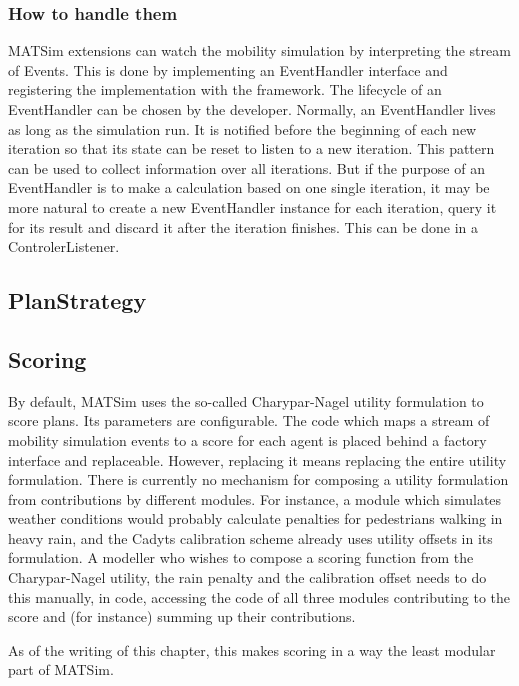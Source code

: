 \subsubsection{How to handle them}
MATSim extensions can watch the mobility simulation by interpreting the stream of Events. This is done
by implementing an EventHandler interface and registering the implementation with the framework. The lifecycle of
an EventHandler can be chosen by the developer. Normally, an EventHandler lives as long as the simulation run.
It is notified before the beginning of each new iteration so that its state can be reset to listen to a new
iteration. This pattern can be used to collect information over all iterations. But if the purpose of
an EventHandler is to make a calculation based on one single iteration, it may be more natural
to create a new EventHandler instance for each iteration, query it for its result and discard it
after the iteration finishes. This can be done in a ControlerListener.
\subsection{PlanStrategy}

\subsection{Scoring}
By default, MATSim uses the so-called Charypar-Nagel utility formulation to score plans. Its parameters
are configurable.
The code which maps a stream of mobility simulation events to a score for each agent is placed behind a factory
 interface and replaceable. However, replacing it means replacing the entire utility formulation. There is
 currently no mechanism for composing a utility formulation from contributions by different modules.
 For instance, a module which simulates weather conditions would probably calculate penalties for pedestrians
  walking in heavy rain, and the Cadyts calibration scheme already uses utility offsets in its formulation. A modeller
  who wishes to compose a scoring function from the Charypar-Nagel utility, the rain penalty and the calibration offset
  needs to do this manually, in code, accessing the code of all three modules contributing to the score and (for instance) summing
  up their contributions.

As of the writing of this chapter, this makes scoring in a way the least modular part of MATSim. 



